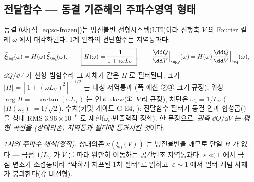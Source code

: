 \subsection{전달함수 --- 동결 기준해의 주파수영역 형태}\label{sec:sc-transfer}
동결 0차(식~\eqref{eq:sc-frozen})는 병진불변 선형시스템(LTI)이라 진행축 $V$ 의 Fourier 켤레 $\omega$ 에서 대각화된다.
1계 완화의 전달함수는 저역통과다:
\begin{equation}
\widehat{\xi}_{\mathrm{lag}}(\omega)=H(\omega)\,\widehat{\xi}_{\eq}(\omega),\qquad
\boxed{\,H(\omega)=\frac1{1+i\omega L_V}\,},\qquad
\frac{\dd Q}{\dd V}\Big|_{\app}(\omega)=H(\omega)\,\frac{\dd Q}{\dd V}\Big|_{\eq}(\omega),
\label{eq:sc-transfer}
\end{equation}
$\dd Q/\dd V$ 가 선형 범함수라 그 자체가 같은 $H$ 로 필터된다. 크기 $|H|=[1+(\omega L_V)^2]^{-1/2}$ 는 대칭 저역통과
(폭 예산 ②③ 크기 규정), 위상 $\arg H=-\arctan(\omega L_V)$ 는 인과 skew(① 꼬리 규정), 차단은 $\omega_c=1/L_V$
($|H(\omega_c)|=1/\sqrt2$). 수치(커밋 게이트 G-E4, ): 전달함수 필터가 동결
인과 합성곱()을 상대 RMS $3.96\times10^{-6}$ 로 재현($\omega_c$$\cdot$반출력점 정합).
한 문장으로: \emph{관측 $\dd Q/\dd V$ 는 평형 곡선을 (상태의존) 저역통과 필터에 통과시킨 것}이다.

\emph{1차의 주파수 해석(정직).} 상태의존 $\kappa(\xi_0(V))$ 는 병진불변을 깨므로 단일 $H$ 가 없다 --- 극점 $1/L_V$ 가
$V$ 를 따라 완만히 이동하는 공간변조 저역통과다. $\varepsilon\ll1$ 에서 극점 변조가 소섭동이라 ``약하게 처프된 1차
필터''로 읽히고, $\varepsilon\sim1$ 에서 필터 개념 자체가 붕괴한다(강 비선형).

